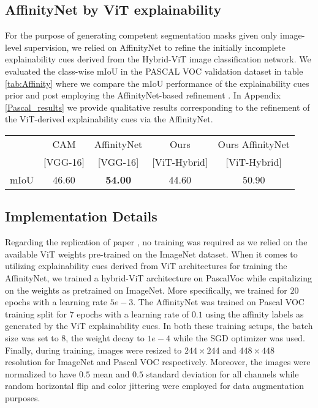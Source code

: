 \documentclass{article}
\begin{document}
\subsection{AffinityNet by ViT explainability}
For the purpose of generating competent segmentation masks given only image-level supervision, we relied on AffinityNet to refine the initially incomplete explainability cues derived from the Hybrid-ViT image classification network. We evaluated the class-wise mIoU in the PASCAL VOC validation dataset in table \ref{tab:Affinity} where we compare the mIoU performance of the explainability cues prior and post employing the AffinityNet-based refinement \cite{ahn2018learning}. In Appendix \ref{Pascal_results} we provide qualitative results corresponding to the refinement of the ViT-derived explainability cues via the AffinityNet.


\begin{table*}[!h]
    \begin{tabular*}{\linewidth}{@{\extracolsep{\fill}}lcccc}
        \toprule
        &CAM \cite{zhou2016learning} & AffinityNet \cite{ahn2018learning} & Ours & Ours AffinityNet \\
        &[VGG-16] & [VGG-16] & [ViT-Hybrid] & [ViT-Hybrid] \\  

        
        \midrule
        mIoU & 46.60 & \textbf{54.00} & 44.60 & 50.90\\
        \bottomrule
    \end{tabular*}
    \caption{Segmentation performance on the Pascal VOC segmentation \cite{Everingham15} dataset (percent). Higher is better.}
    \label{tab:Affinity}
\end{table*}


\subsection{Implementation Details}
Regarding the replication of paper \cite{mainpaper}, no training was required as we relied on the available ViT weights pre-trained on the ImageNet dataset. When it comes to utilizing explainability cues derived from ViT architectures for training the AffinityNet, we trained a hybrid-ViT architecture on PascalVoc while capitalizing on the weights as pretrained on ImageNet. More specifically, we trained for $20$ epochs with a learning rate $5e-3$. The AffinityNet was trained on Pascal VOC training split for $7$ epochs with a learning rate of $0.1$ using the affinity labels as generated by the ViT explainability cues. In both these training setups, the batch size was set to $8$, the weight decay to $1e-4$ while the SGD optimizer was used. Finally, during training, images were resized to $244\times244$ and $448\times448$ resolution for ImageNet and Pascal VOC respectively. Moreover, the images were normalized to have $0.5$ mean and $0.5$ standard deviation for all channels while  random horizontal flip and color jittering were employed for data augmentation purposes.
\end{document}

